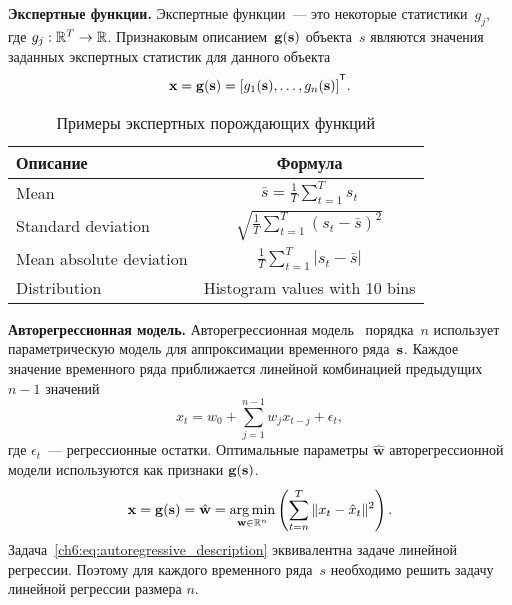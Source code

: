 \documentclass[11pt, a5paper]{dissert}
\begin{document}
\textbf{Экспертные функции.}
Экспертные функции~--- это некоторые статистики~$g_j$, где $g_j: \mathbb{R}^T \rightarrow \mathbb{R}$.
Признаковым описанием~$\mathbf{g}(\mathbf{s})$ объекта~$s$ являются значения заданных экспертных статистик для данного объекта
\[
	\bx = \mathbf{g}(\bs) = [g_1(\bs), \dots, g_n(\bs)]^{\T}.
\]

\begin{table}[ht]
	\centering
	\caption{Примеры экспертных порождающих функций}
	\begin{tabular}{|l|c|}
		\hline
		\textbf{Описание}    & \textbf{Формула} \\ \hline
		Mean                    & $\bar{s} = \frac{1}{T} \sum_{t=1}^{T} s_t$    \\ \hline
		Standard deviation      & $\sqrt{\frac{1}{T} \sum_{t=1}^{T} (s_t - \bar{s})^2}$    \\ \hline
		Mean absolute deviation & $\frac{1}{T} \sum_{t=1}^{T} |s_t - \bar{s}|$    \\ \hline
		Distribution            &  Histogram values with 10 bins    \\ \hline
	\end{tabular}
	\label{ch6:tbl:expert_functions}
\end{table}

\textbf{Авторегрессионная модель.}
Авторегрессионная модель~\cite{lukashin2003adaptive} порядка~$n$
использует параметрическую модель для аппроксимации временного ряда~$\mathbf{s}$. 
Каждое значение временного ряда приближается линейной комбинацией предыдущих $n-1$ значений
\begin{equation*}
	x_t = w_0 + \sum_{j=1}^{n-1} w_j x_{t-j} + \epsilon_t,
\end{equation*}
где $\epsilon_t$~--- регрессионные остатки.
Оптимальные параметры $\hat{\mathbf{w}}$ авторегрессионной модели используются как признаки $\mathbf{g}(\mathbf{s})$.
\begin{equation}
	\mathbf{x} = \mathbf{g}(\mathbf{s}) = \hat{\mathbf{w}} = \mathop{\arg \min}\limits_{\mathbf{w} \in \mathbb{R}^{n}} \left( \sum_{t=n}^{T} \|x_t - \hat{x}_t\|^2\right).
	\label{ch6:eq:autoregressive_description}
\end{equation}
Задача~\eqref{ch6:eq:autoregressive_description} эквивалентна задаче линейной регрессии.
Поэтому для каждого временного ряда~$s$ необходимо решить задачу линейной регрессии размера $n$.
\end{document}
